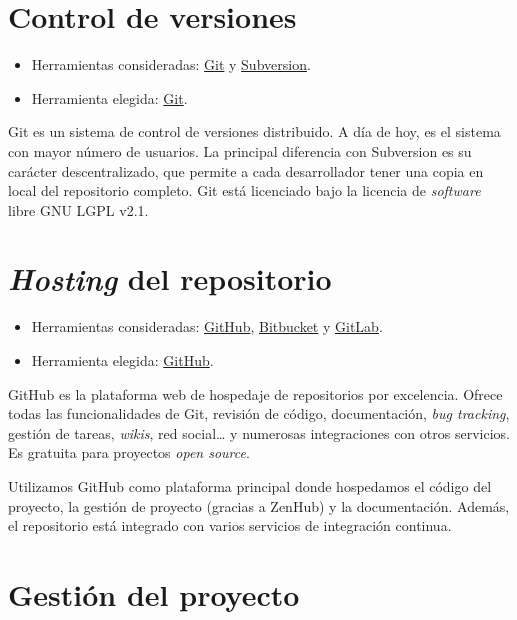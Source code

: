 
\section{Control de versiones}\label{control-de-versiones}

\begin{itemize}
\tightlist
\item
  Herramientas consideradas: \href{https://git-scm.com/}{Git} y
  \href{https://subversion.apache.org/}{Subversion}.
\item
  Herramienta elegida: \href{https://git-scm.com/}{Git}.
\end{itemize}

Git es un sistema de control de versiones distribuido. A día de hoy, es
el sistema con mayor número de usuarios. La principal diferencia con
Subversion es su carácter descentralizado, que permite a cada
desarrollador tener una copia en local del repositorio completo. Git
está licenciado bajo la licencia de \emph{software} libre GNU LGPL v2.1.

\section{\emph{Hosting} del repositorio}\label{hosting-del-repositorio}

\begin{itemize}
\tightlist
\item
  Herramientas consideradas: \href{https://github.com/}{GitHub},
  \href{https://bitbucket.org/}{Bitbucket} y
  \href{https://gitlab.com/}{GitLab}.
\item
  Herramienta elegida: \href{https://github.com/}{GitHub}.
\end{itemize}

GitHub es la plataforma web de hospedaje de repositorios por excelencia.
Ofrece todas las funcionalidades de Git, revisión de código,
documentación, \emph{bug tracking}, gestión de tareas, \emph{wikis}, red
social\ldots{} y numerosas integraciones con otros servicios. Es
gratuita para proyectos \emph{open source}.

Utilizamos GitHub como plataforma principal donde hospedamos el código
del proyecto, la gestión de proyecto (gracias a ZenHub) y la
documentación. Además, el repositorio está integrado con varios
servicios de integración continua.

\section{Gestión del proyecto}\label{gestion-del-proyecto}

